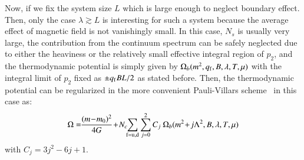 \documentclass[aps,prd,amsmath,two column,amssymb,showpacs]{revtex4}
\begin{document}
Now, if we fix the system size $L$ which is large enough to neglect boundary effect. Then, only the case $\lambda\gtrsim L$ is interesting for such a system because the average effect of magnetic field is not vanishingly small. In this case, $N_s$ is usually very large, the contribution from the continuum spectrum can be safely neglected due to either the heaviness or the relatively small effective integral region of $p_2$, and the thermodynamic potential is simply given by $\Omega_b(m^2,q_{\rm f},B,\lambda,T,\mu)$ with the integral limit of $p_2$ fixed as $\pm q_{\rm f}BL/2$ as stated before. Then, the thermodynamic potential can be regularized in the more convenient Pauli-Villars scheme~\cite{Cao:2015xja} in this case as:
\begin{eqnarray}
\Omega=\!\!{(m\!-\!m_0)^2\over4G}\!+\!N_c\!\!\sum_{\rm f=u,d}\sum_{j=0}^{2}C_j~\Omega_b(m^2\!+\!j\Lambda^2,B,\lambda,T,\mu)
\end{eqnarray}
with $C_j=3j^2-6j+1$. 
\end{document}
